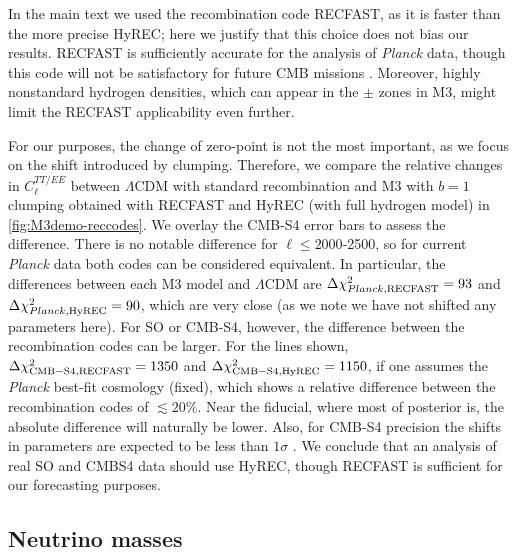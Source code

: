 In the main text we used the recombination code RECFAST, as it is faster than the more precise HyREC; here we justify that this choice does not bias our results.
RECFAST is sufficiently accurate for the analysis of {\it Planck} data, though this code will not be satisfactory for future CMB missions \citep{hyrec2}.
Moreover, highly nonstandard hydrogen densities, which can appear in the $\pm$ zones in M3, might limit the RECFAST applicability even further.

For our purposes, the change of zero-point is not the most important, as we focus on the shift introduced by clumping.
Therefore, we compare the relative changes in $C_\ell^{TT/EE}$ between $\Lambda$CDM with standard recombination and M3 with $b=1$ clumping obtained with RECFAST and HyREC (with full hydrogen model) in \cref{fig:M3demo-reccodes}.
We overlay the CMB-S4 error bars to assess the difference.
There is no notable difference for $\ell\leq 2000$-2500, so for current {\it Planck} data both codes can be considered equivalent.
In particular, the differences between each M3 model and $\Lambda$CDM are $\Delta\chi^2_{Planck,\rm RECFAST}=93$ and $\Delta\chi^2_{Planck,\rm HyREC}=90$, which are very close (as we note we have not shifted any parameters here).
For SO or CMB-S4, however, the difference between the recombination codes can be larger. 
For the lines shown, $\Delta\chi^2_{\rm CMB-S4,RECFAST}=1350$ and $\Delta\chi^2_{\rm CMB-S4,HyREC}=1150$, if one assumes the {\it Planck} best-fit cosmology (fixed), which shows a relative difference between the recombination codes of $\lesssim 20\%$.
Near the fiducial, where most of posterior is, the absolute difference will naturally be lower.
Also, for CMB-S4 precision the shifts in parameters are expected to be less than $1\sigma$ \citep{hyrec2}.
We conclude that an analysis of real SO and CMBS4 data  should use HyREC, though RECFAST is sufficient for our forecasting purposes.

\subsection{Neutrino masses}
\label{sec:justify-mnu}


